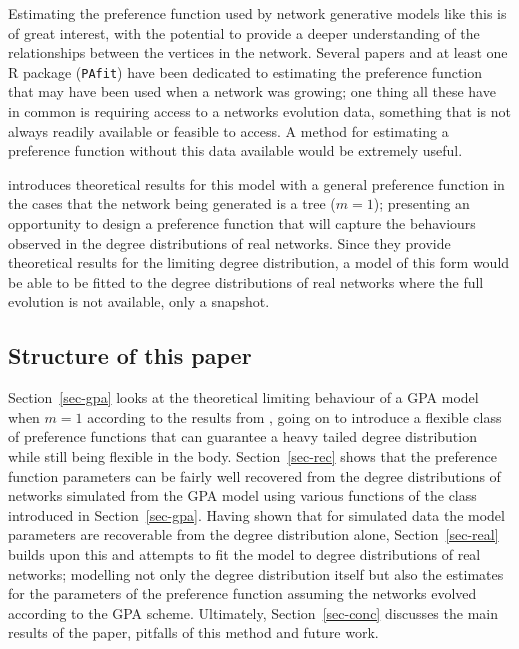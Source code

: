 \documentclass[
  sn-basic,
]{sn-jnl}
\theoremstyle{plain}
\theoremstyle{remark}
\begin{document}
Estimating the preference function used by network generative models
like this is of great interest, with the potential to provide a deeper
understanding of the relationships between the vertices in the network.
Several papers and at least one R package (\texttt{PAfit}) have been
dedicated to estimating the preference function that may have been used
when a network was growing; one thing all these have in common is
requiring access to a networks evolution data, something that is not
always readily available or feasible to access. A method for estimating
a preference function without this data available would be extremely
useful.

\citep{rudas07} introduces theoretical results for this model with a
general preference function in the cases that the network being
generated is a tree (\(m=1\)); presenting an opportunity to design a
preference function that will capture the behaviours observed in the
degree distributions of real networks. Since they provide theoretical
results for the limiting degree distribution, a model of this form would
be able to be fitted to the degree distributions of real networks where
the full evolution is not available, only a snapshot.

\subsection{Structure of this paper}\label{structure-of-this-paper}

Section~\ref{sec-gpa} looks at the theoretical limiting behaviour of a
GPA model when \(m=1\) according to the results from \citep{rudas07},
going on to introduce a flexible class of preference functions that can
guarantee a heavy tailed degree distribution while still being flexible
in the body. Section~\ref{sec-rec} shows that the preference function
parameters can be fairly well recovered from the degree distributions of
networks simulated from the GPA model using various functions of the
class introduced in Section~\ref{sec-gpa}. Having shown that for
simulated data the model parameters are recoverable from the degree
distribution alone, Section~\ref{sec-real} builds upon this and attempts
to fit the model to degree distributions of real networks; modelling not
only the degree distribution itself but also the estimates for the
parameters of the preference function assuming the networks evolved
according to the GPA scheme. Ultimately, Section~\ref{sec-conc}
discusses the main results of the paper, pitfalls of this method and
future work.
\end{document}
